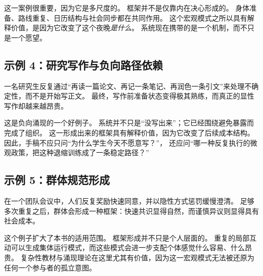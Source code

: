 \begin{discussion}
这一案例很重要，因为它是多尺度的。
框架并不是仅靠内在决心形成的。
身体准备、路线重复、日历结构与社会同步都在共同作用。
这个宏观模式之所以具有解释价值，是因为它改变了这个夜晚\emph{是什么}。
系统现在携带的是一个机制，而不只是一个愿望。
\end{discussion}

\subsection{示例 4：研究写作与负向路径依赖}

\begin{example}[回避被组织成一种能力]
一名研究生反复通过“再读一篇论文、再记一条笔记、再润色一条引文”来处理不确定性，而不是开始写正文。
最终，写作前准备状态变得极其熟练，而真正的显性写作却越来越昂贵。
\end{example}

\begin{discussion}
这是负向涌现的一个好例子。
系统并不只是“没写出来”；它已经围绕避免暴露而完成了组织。
这一形成出来的框架具有解释价值，因为它改变了后续成本结构。
因此，手稿不应只问“为什么学生今天不愿意写？”，
还应问“哪一种反复执行的微观政策，把这种退缩训练成了一条稳定路径？”
\end{discussion}

\subsection{示例 5：群体规范形成}

\begin{example}[框架也可以是集体性的]
在一个团队会议中，人们反复奖励快速同意，并以隐性方式惩罚缓慢澄清。
足够多次重复之后，群体会形成一种框架：快速共识显得自然，而谨慎异议则显得具有社会成本。
\end{example}

\begin{discussion}
这个例子扩大了本书的适用范围。
框架形成并不只是个人层面的。
重复的局部互动可以生成集体运行模式，而这些模式会进一步支配个体感觉什么容易、什么昂贵。
复杂性教材与涌现理论在这里尤其有价值，因为这一宏观模式无法被还原为任何一个参与者的孤立意图。
\end{discussion}
